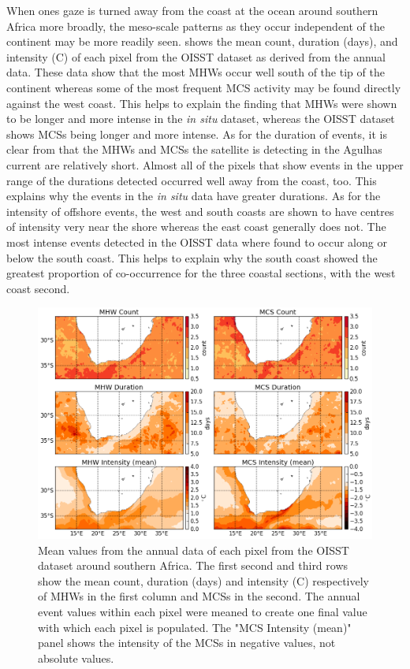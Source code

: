 \documentclass[a4paper,10pt,review]{elsarticle}
\begin{document}
When ones gaze is turned away from the coast at the ocean around southern Africa more broadly, the meso-scale patterns as they occur independent of the continent may be more readily seen.  shows the mean count, duration (days), and intensity (\degree C) of each pixel from the OISST dataset as derived from the annual data. These data show that the most MHWs occur well south of the tip of the continent whereas some of the most frequent MCS activity may be found directly against the west coast. This helps to explain the finding that MHWs were shown to be longer and more intense in the \emph{in situ} dataset, whereas the OISST dataset shows MCSs being longer and more intense. As for the duration of events, it is clear from  that the MHWs and MCSs the satellite is detecting in the Agulhas current are relatively short. Almost all of the pixels that show events in the upper range of the durations detected occurred well away from the coast, too. This explains why the events in the \emph{in situ} data have greater durations. As for the intensity of offshore events, the west and south coasts are shown to have centres of intensity very near the shore whereas the east coast generally does not. The most intense events detected in the OISST data where found to occur along or below the south coast. This helps to explain why the south coast showed the greatest proportion of co-occurrence for the three coastal sections, with the west coast second.

\begin{figure}
\centering \includegraphics[width=1.0\textwidth]{MHW_MCS_mean.png}
\caption{Mean values from the annual data of each pixel from the OISST dataset around southern Africa. The first second and third rows show the mean count, duration (days) and intensity (\degree C) respectively of MHWs in the first column and MCSs in the second. The annual event values within each pixel were meaned to create one final value with which each pixel is populated. The "MCS Intensity (mean)" panel shows the intensity of the MCSs in negative values, not absolute values.} \label{fig:Figure6}
\end{figure}
\end{document}
